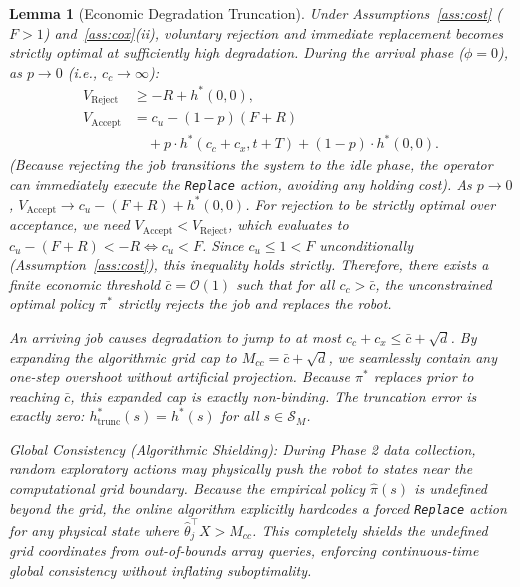 \documentclass[letterpaper, 10 pt, conference]{IEEEconf}
\newtheorem{lemma}{Lemma}
\newcommand{\what}[1]{\widehat{#1}}
\begin{document}
\begin{lemma}[Economic Degradation Truncation]
    \label{lem:truncation}
    Under Assumptions~\ref{ass:cost} ($F > 1$) and~\ref{ass:cox}(ii), voluntary rejection and immediate replacement becomes strictly optimal at sufficiently high degradation. During the arrival phase ($\phi=0$), as $p \to 0$ (i.e., $c_c \to \infty$):
    \begin{align*}
        V_{\mathrm{Reject}} &\ge -R + h^*(0, 0), \\
        V_{\mathrm{Accept}} &= c_u - (1-p)(F+R) \\
        &\quad + p \cdot h^*(c_c + c_x, t+T) + (1-p) \cdot h^*(0, 0).
    \end{align*}
    (Because rejecting the job transitions the system to the idle phase, the operator can immediately execute the \texttt{Replace} action, avoiding any holding cost). As $p \to 0$, $V_{\mathrm{Accept}} \to c_u - (F + R) + h^*(0, 0)$. For rejection to be strictly optimal over acceptance, we need $V_{\mathrm{Accept}} < V_{\mathrm{Reject}}$, which evaluates to $c_u - (F+R) < -R \iff c_u < F$. Since $c_u \le 1 < F$ unconditionally (Assumption~\ref{ass:cost}), this inequality holds strictly. Therefore, there exists a finite economic threshold $\bar{c} = \mathcal{O}(1)$ such that for all $c_c > \bar{c}$, the unconstrained optimal policy $\pi^*$ strictly rejects the job and replaces the robot.

    An arriving job causes degradation to jump to at most $c_c + c_x \le \bar{c} + \sqrt{d}$. By expanding the algorithmic grid cap to $M_{cc} = \bar{c} + \sqrt{d}$, we seamlessly contain any one-step overshoot without artificial projection. Because $\pi^*$ replaces prior to reaching $\bar{c}$, this expanded cap is exactly non-binding. The truncation error is exactly zero: $h^*_{\mathrm{trunc}}(s) = h^*(s)$ for all $s \in \mathcal{S}_{M}$.

    \emph{Global Consistency (Algorithmic Shielding):} During Phase 2 data collection, random exploratory actions may physically push the robot to states near the computational grid boundary. Because the empirical policy $\what{\pi}(s)$ is undefined beyond the grid, the online algorithm explicitly hardcodes a forced \texttt{Replace} action for any physical state where $\what{\theta}_j^\top X > M_{cc}$. This completely shields the undefined grid coordinates from out-of-bounds array queries, enforcing continuous-time global consistency without inflating suboptimality.
\end{lemma}
\end{document}
